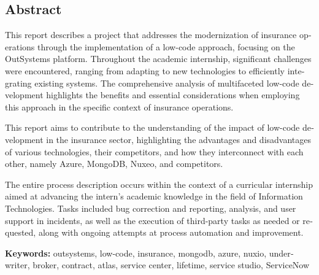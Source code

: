 \begin{otherlanguage}{english}
    \section{Abstract}\label{sec:abstract}

    This report describes a project that addresses the modernization of insurance operations through the implementation of a low-code approach, focusing on the OutSystems platform. Throughout the academic internship, significant challenges were encountered, ranging from adapting to new technologies to efficiently integrating existing systems. The comprehensive analysis of multifaceted low-code development highlights the benefits and essential considerations when employing this approach in the specific context of insurance operations.
    
    This report aims to contribute to the understanding of the impact of low-code development in the insurance sector, highlighting the advantages and disadvantages of various technologies, their competitors, and how they interconnect with each other, namely Azure, MongoDB, Nuxeo, and competitors.
    
    The entire process description occurs within the context of a curricular internship aimed at advancing the intern's academic knowledge in the field of Information Technologies. Tasks included bug correction and reporting, analysis, and user support in incidents, as well as the execution of third-party tasks as needed or requested, along with ongoing attempts at process automation and improvement.
    
    \medskip
    \noindent
    {\small{\bf Keywords:}
    outsystems, low-code, insurance, mongodb, azure, nuxio, underwriter, broker, contract, atlas, service center, lifetime, service studio, ServiceNow}
\end{otherlanguage}